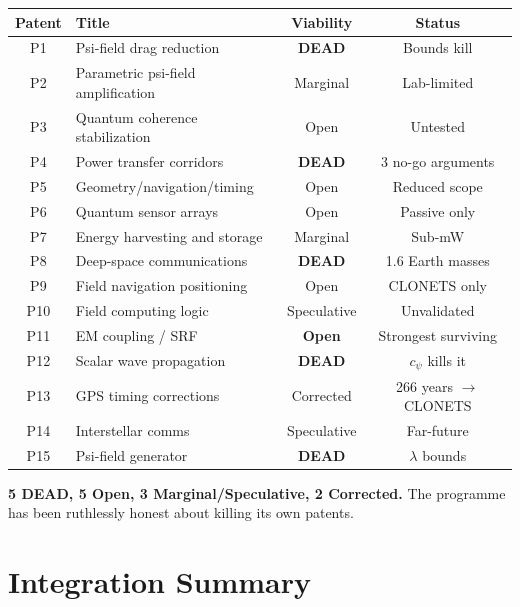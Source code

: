 \documentclass[11pt,a4paper]{article}
\begin{document}
\begin{center}
\begin{tabular}{clcc}
\toprule
\textbf{Patent} & \textbf{Title} & \textbf{Viability} & \textbf{Status} \\
\midrule
P1 & Psi-field drag reduction & \textbf{DEAD} & Bounds kill \\
P2 & Parametric psi-field amplification & Marginal & Lab-limited \\
P3 & Quantum coherence stabilization & Open & Untested \\
P4 & Power transfer corridors & \textbf{DEAD} & 3 no-go arguments \\
P5 & Geometry/navigation/timing & Open & Reduced scope \\
P6 & Quantum sensor arrays & Open & Passive only \\
P7 & Energy harvesting and storage & Marginal & Sub-mW \\
P8 & Deep-space communications & \textbf{DEAD} & 1.6 Earth masses \\
P9 & Field navigation positioning & Open & CLONETS only \\
P10 & Field computing logic & Speculative & Unvalidated \\
P11 & EM coupling / SRF & \textbf{Open} & Strongest surviving \\
P12 & Scalar wave propagation & \textbf{DEAD} & $c_\psi$ kills it \\
P13 & GPS timing corrections & Corrected & 266 years $\to$ CLONETS \\
P14 & Interstellar comms & Speculative & Far-future \\
P15 & Psi-field generator & \textbf{DEAD} & $\lambda$ bounds \\
\bottomrule
\end{tabular}
\end{center}

\textbf{5 DEAD, 5 Open, 3 Marginal/Speculative, 2 Corrected.} The programme has been ruthlessly honest about killing its own patents.

\section{Integration Summary}
\end{document}
